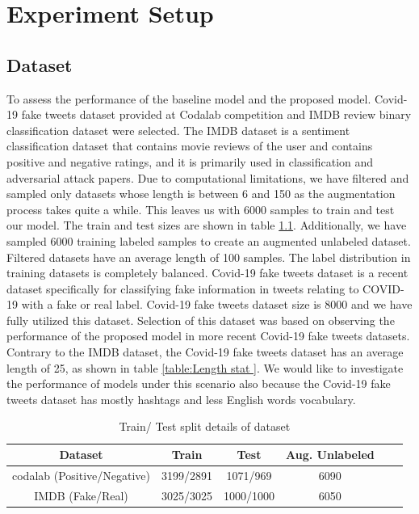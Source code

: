 \documentclass[%
	BCOR=8mm, %
	DIV=12,
	toc=bibliography, %
	toc=listof, %
	oneside, %
	egregdoesnotlikesansseriftitles, %
	]{scrbook}
\begin{document}
\chapter{Experiment Setup}
\label{chapter:experiment}

\section{Dataset}
\label{label:dataset}
To assess the performance of the baseline model and the proposed model. Covid-19  fake tweets dataset \cite{patwa_fighting_2021} provided at Codalab competition and IMDB review binary classification dataset were selected. The IMDB dataset is a sentiment classification dataset\cite{maas_learning_2011-1} that contains movie reviews of the user and contains positive and negative ratings, and it is primarily used in classification and adversarial attack papers.
 Due to computational limitations, we have filtered and sampled only datasets whose length is between 6 and 150 as the augmentation process takes quite a while. This leaves us with 6000 samples to train and test our model. The train and test sizes are shown in table \ref{table:train/test table }. Additionally, we have sampled 6000 training labeled samples to create an augmented unlabeled dataset. Filtered datasets have an average length of 100 samples. The label distribution in training datasets is completely balanced.
Covid-19 fake tweets dataset is a recent dataset specifically for classifying fake information in tweets relating to COVID-19 with a fake or real label. Covid-19 fake tweets dataset size is 8000 and we have fully utilized this dataset. Selection of this dataset was based on observing the performance of the proposed model in more recent Covid-19 fake tweets datasets. Contrary to the IMDB dataset, the Covid-19  fake tweets dataset has an average length of 25, as shown in table \ref{table:Length stat }.
We would like to investigate the performance of models under this scenario also because the Covid-19  fake tweets dataset has mostly hashtags and less English words vocabulary.

\begin{table}[!h]
\centering
\begin{tabular}{ |c|c|c|c|c|c| }
\hline
Dataset & Train & Test  & Aug. Unlabeled \\
\hline
codalab (Positive/Negative) & 3199/2891 & 1071/969 & 6090 \\
\hline
IMDB (Fake/Real) & 3025/3025 & 1000/1000 & 6050  \\
\hline
\end{tabular}
\caption[Train/Augment test data]{Train/ Test split details of dataset }
\label{table:train/test table }
\end{table}
\end{document}
